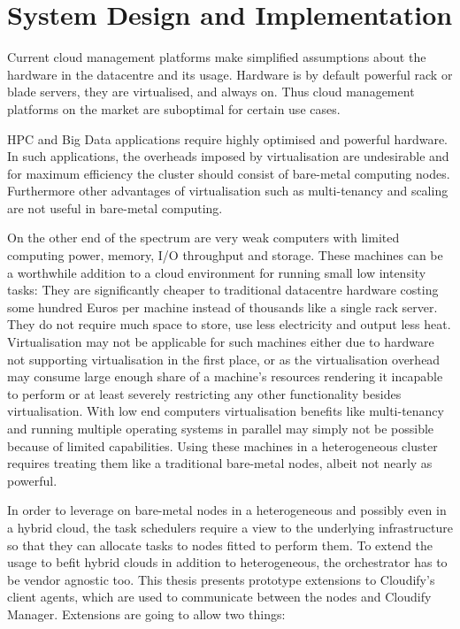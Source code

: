 \section{System Design and Implementation} \label{systemdesign_and_implementation}

Current cloud management platforms make simplified assumptions about the hardware in the datacentre and its usage. Hardware is by default powerful rack or blade servers, they are virtualised, and always on. Thus cloud management platforms on the market are suboptimal for certain use cases.

HPC and Big Data applications require highly optimised and powerful hardware. In such applications, the overheads imposed by virtualisation are undesirable and for maximum efficiency the cluster should consist of bare-metal computing nodes. Furthermore other advantages of virtualisation such as multi-tenancy and scaling are not useful in bare-metal computing.

On the other end of the spectrum are very weak computers with limited computing power, memory, I/O throughput and storage. These machines can be a worthwhile addition to a cloud environment for running small low intensity tasks: They are significantly cheaper to traditional datacentre hardware costing some hundred Euros per machine instead of thousands like a single rack server. They do not require much space to store, use less electricity and output less heat. Virtualisation may not be applicable for such machines either due to hardware not supporting virtualisation in the first place, or as the virtualisation overhead may consume large enough share of a machine's resources rendering it incapable to perform or at least severely restricting any other functionality besides virtualisation. With low end computers virtualisation benefits like multi-tenancy and running multiple operating systems in parallel may simply not be possible because of limited capabilities. Using these machines in a heterogeneous cluster requires treating them like a traditional bare-metal nodes, albeit not nearly as powerful.

In order to leverage on bare-metal nodes in a heterogeneous and possibly even in a hybrid cloud, the task schedulers require a view to the underlying infrastructure so that they can allocate tasks to nodes fitted to perform them. To extend the usage to befit hybrid clouds in addition to heterogeneous, the orchestrator has to be vendor agnostic too. This thesis presents prototype extensions to Cloudify's \cite{cloudify} client agents, which are used to communicate between the nodes and Cloudify Manager. Extensions are going to allow two things:

